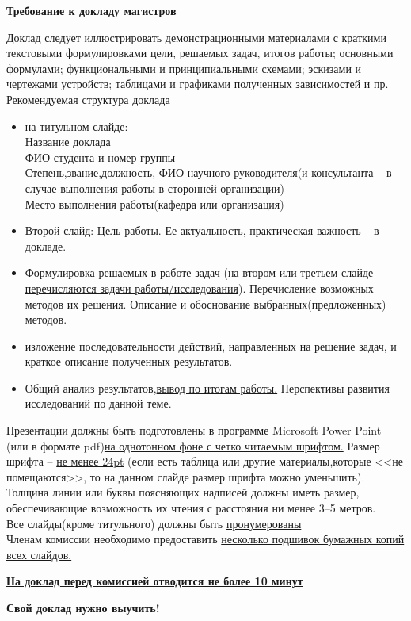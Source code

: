 \documentclass{report}
\begin{document}
\begin{center}
\textbf{Требование к докладу магистров}
\end{center}

\textrm{Доклад следует иллюстрировать демонстрационными материалами с краткими текстовыми формулировками цели, решаемых задач, итогов работы; основными формулами; функциональными и принципиальными схемами; эскизами и чертежами устройств; таблицами и графиками полученных зависимостей и пр.} \\
\underline{Рекомендуемая структура доклада}
\begin{itemize}
\item\underline{на титульном слайде:} \\ Название доклада\\ ФИО студента и номер группы \\Степень,звание,должность, ФИО научного руководителя(и консультанта -- в случае выполнения работы в сторонней организации)\\ Место выполнения работы(кафедра или организация)

\item\underline{Второй слайд: Цель работы.} Ее актуальность, практическая важность -- в докладе.
\item Формулировка решаемых в работе задач (на втором или третьем слайде \underline{перечисляются задачи работы/исследования}). Перечисление возможных методов их решения. Описание и обоснование выбранных(предложенных) методов.
\item изложение последовательности действий, направленных на решение задач, и краткое описание полученных результатов.
\item Общий анализ результатов,\underline{вывод по итогам работы.} Перспективы развития исследований по данной теме.
\end{itemize}
\textrm{Презентации должны быть подготовлены в программе Microsoft Power Point (или в формате pdf)\underline{на однотонном фоне с четко читаемым шрифтом.} Размер шрифта -- \underline{не менее 24pt} (если есть таблица или другие материалы,которые <<не помещаются>>, то на данном слайде размер шрифта можно уменьшить). Толщина линии или буквы поясняющих надписей должны иметь размер, обеспечивающие возможность их чтения с расстояния ни менее 3--5 метров. 
\\ Все слайды(кроме титульного) должны быть \underline{пронумерованы} 
\\ Членам комиссии необходимо предоставить \underline{несколько подшивок бумажных копий всех слайдов.}}

\begin{center}
\textbf{\underline{На доклад перед комиссией отводится не более 10 минут}}
\end{center}

\begin{center}
\textbf{Свой доклад нужно выучить!}
\end{center}
\end{document}
